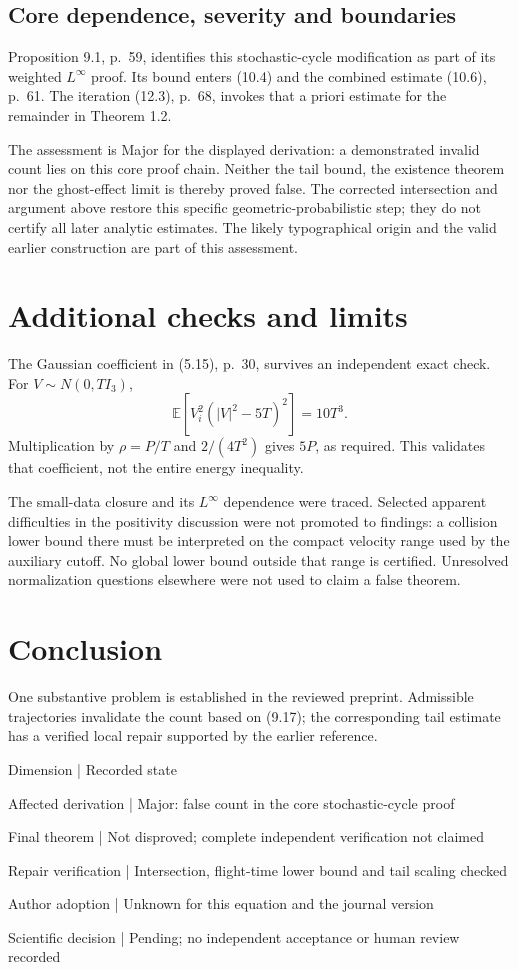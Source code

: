 \documentclass[10pt]{article}
\begin{document}
\subsection*{Core dependence, severity and boundaries}
Proposition 9.1, p. 59, identifies this stochastic-cycle modification as part of its weighted \(L^\infty\) proof. Its bound enters (10.4) and the combined estimate (10.6), p. 61. The iteration (12.3), p. 68, invokes that a priori estimate for the remainder in Theorem 1.2.\par
The assessment is Major for the displayed derivation: a demonstrated invalid count lies on this core proof chain. Neither the tail bound, the existence theorem nor the ghost-effect limit is thereby proved false. The corrected intersection and argument above restore this specific geometric-probabilistic step; they do not certify all later analytic estimates. The likely typographical origin and the valid earlier construction are part of this assessment.\par
\section*{Additional checks and limits}
The Gaussian coefficient in (5.15), p. 30, survives an independent exact check. For \(V\sim N(0,TI_3)\), \[\mathbb E[V_i^2(|V|^2-5T)^2]=10T^3.\] Multiplication by \(\rho=P/T\) and \(2/(4T^2)\) gives \(5P\), as required. This validates that coefficient, not the entire energy inequality.\par
The small-data closure and its \(L^\infty\) dependence were traced. Selected apparent difficulties in the positivity discussion were not promoted to findings: a collision lower bound there must be interpreted on the compact velocity range used by the auxiliary cutoff. No global lower bound outside that range is certified. Unresolved normalization questions elsewhere were not used to claim a false theorem.\par
\section*{Conclusion}
One substantive problem is established in the reviewed preprint. Admissible trajectories invalidate the count based on (9.17); the corresponding tail estimate has a verified local repair supported by the earlier reference.\par
Dimension | Recorded state\par
Affected derivation | Major: false count in the core stochastic-cycle proof\par
Final theorem | Not disproved; complete independent verification not claimed\par
Repair verification | Intersection, flight-time lower bound and tail scaling checked\par
Author adoption | Unknown for this equation and the journal version\par
Scientific decision | Pending; no independent acceptance or human review recorded\par
\end{document}
